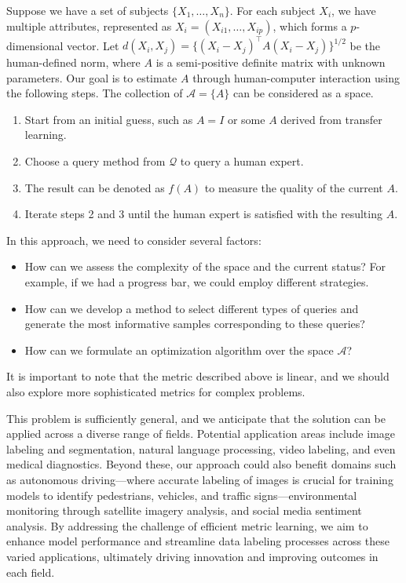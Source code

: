 \documentclass[12pt]{article}
\begin{document}
Suppose we have a set of subjects \(\{X_1, \ldots, X_n\}\). For each subject \(X_i\), we have multiple attributes, represented as \(X_i = (X_{i1}, \ldots, X_{ip})\), which forms a \(p\)-dimensional vector. Let \(d(X_i, X_j) = \{(X_i - X_j)^\top A (X_i - X_j)\}^{1/2}\) be the human-defined norm, where \(A\) is a semi-positive definite matrix with unknown parameters. Our goal is to estimate \(A\) through human-computer interaction using the following steps. The collection of \(\mathcal{A} = \{A\}\) can be considered as a space.

\begin{enumerate}
    \item Start from an initial guess, such as \(A = I\) or some \(A\) derived from transfer learning.
    \item Choose a query method from \(\mathcal{Q}\) to query a human expert.
    \item The result can be denoted as \(f(A)\) to measure the quality of the current \(A\).
    \item Iterate steps 2 and 3 until the human expert is satisfied with the resulting \(A\).  
\end{enumerate}

In this approach, we need to consider several factors:
\begin{itemize}
    \item How can we assess the complexity of the space and the current status? For example, if we had a progress bar, we could employ different strategies.
    \item How can we develop a method to select different types of queries and generate the most informative samples corresponding to these queries?
    \item How can we formulate an optimization algorithm over the space \(\mathcal{A}\)?
\end{itemize}

It is important to note that the metric described above is linear, and we should also explore more sophisticated metrics for complex problems. 

This problem is sufficiently general, and we anticipate that the solution can be applied across a diverse range of fields. Potential application areas include image labeling and segmentation, natural language processing, video labeling, and even medical diagnostics. Beyond these, our approach could also benefit domains such as autonomous driving—where accurate labeling of images is crucial for training models to identify pedestrians, vehicles, and traffic signs—environmental monitoring through satellite imagery analysis, and social media sentiment analysis. By addressing the challenge of efficient metric learning, we aim to enhance model performance and streamline data labeling processes across these varied applications, ultimately driving innovation and improving outcomes in each field.






\end{document}
